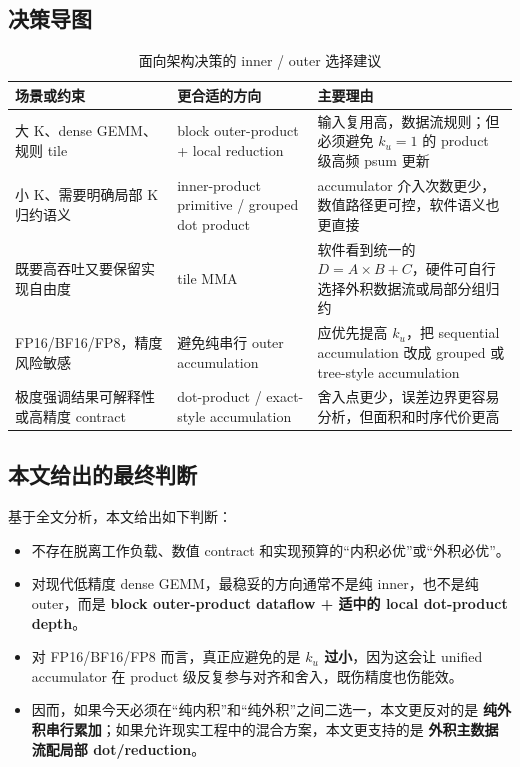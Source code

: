 \documentclass[UTF8,11pt,a4paper]{ctexart}
\newcommand{\ku}{\ensuremath{k_u}}
\begin{document}
\subsection{决策导图}

\begin{table}[H]
  \centering
  \caption{面向架构决策的 inner / outer 选择建议}
  \label{tab:decision}
  \begin{tabularx}{\textwidth}{>{\raggedright\arraybackslash}p{3.0cm} >{\raggedright\arraybackslash}p{3.3cm} >{\raggedright\arraybackslash}X}
    \toprule
    场景或约束 & 更合适的方向 & 主要理由 \\
    \midrule
    大 K、dense GEMM、规则 tile & block outer-product + local reduction & 输入复用高，数据流规则；但必须避免 $\ku=1$ 的 product 级高频 psum 更新 \\
    小 K、需要明确局部 K 归约语义 & inner-product primitive / grouped dot product & accumulator 介入次数更少，数值路径更可控，软件语义也更直接 \\
    既要高吞吐又要保留实现自由度 & tile MMA & 软件看到统一的 $D=A\times B+C$，硬件可自行选择外积数据流或局部分组归约 \\
    FP16/BF16/FP8，精度风险敏感 & 避免纯串行 outer accumulation & 应优先提高 \ku{}，把 sequential accumulation 改成 grouped 或 tree-style accumulation \\
    极度强调结果可解释性或高精度 contract & dot-product / exact-style accumulation & 舍入点更少，误差边界更容易分析，但面积和时序代价更高 \\
    \bottomrule
  \end{tabularx}
\end{table}

\subsection{本文给出的最终判断}

基于全文分析，本文给出如下判断：

\begin{itemize}
  \item 不存在脱离工作负载、数值 contract 和实现预算的“内积必优”或“外积必优”。
  \item 对现代低精度 dense GEMM，最稳妥的方向通常不是纯 inner，也不是纯 outer，而是
  \textbf{block outer-product dataflow + 适中的 local dot-product depth}。
  \item 对 FP16/BF16/FP8 而言，真正应避免的是 \textbf{\ku{} 过小}，因为这会让 unified accumulator
  在 product 级反复参与对齐和舍入，既伤精度也伤能效。
  \item 因而，如果今天必须在“纯内积”和“纯外积”之间二选一，本文更反对的是
  \textbf{纯外积串行累加}；如果允许现实工程中的混合方案，本文更支持的是
  \textbf{外积主数据流配局部 dot/reduction}。
\end{itemize}
\end{document}
